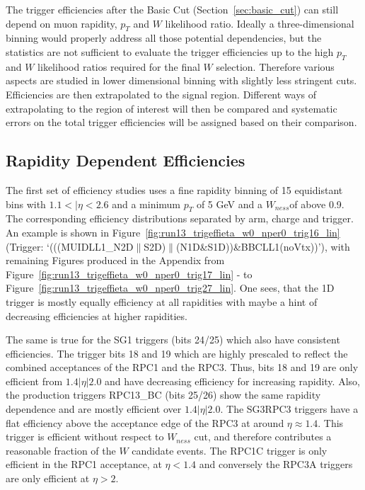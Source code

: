 The trigger efficiencies after the Basic Cut (Section~\ref{sec:basic_cut}) can
still depend on muon rapidity, $p_T$ and $W$ likelihood ratio.  Ideally a
three-dimensional binning would properly address all those potential
dependencies, but the statistics are not sufficient to evaluate the trigger
efficiencies up to the high $p_T$ and $W$ likelihood ratios required for the
final $W$ selection. Therefore various aspects are studied in lower dimensional
binning with slightly less stringent cuts. Efficiencies are then extrapolated to
the signal region. Different ways of extrapolating to the region of interest
will then be compared and systematic errors on the total trigger efficiencies
will be assigned based on their comparison. 

\subsection{Rapidity Dependent Efficiencies}

The first set of efficiency studies uses a fine rapidity binning of 15
equidistant bins with $1.1<\vert\eta<2.6$ and a minimum $p_T$ of 5 GeV and a
$W_{ness}$of above 0.9.  The corresponding efficiency distributions separated by
arm, charge and trigger. An example is shown in
Figure~\ref{fig:run13_trigeffieta_w0_nper0_trig16_lin} (Trigger:
`(((MUIDLL1\_N2D$\|$S2D)$\|$(N1D\&S1D))\&BBCLL1(noVtx))'), with remaining
Figures produced in the Appendix from
Figure~\ref{fig:run13_trigeffieta_w0_nper0_trig17_lin} - to
Figure~\ref{fig:run13_trigeffieta_w0_nper0_trig27_lin}. One sees, that the 1D
trigger is mostly equally efficiency at all rapidities with maybe a hint of
decreasing efficiencies at higher rapidities. 

The same is true for the SG1 triggers (bits 24/25) which also have consistent
efficiencies.  The trigger bits 18 and 19 which are highly prescaled to reflect
the combined acceptances of the RPC1 and the RPC3. Thus, bits 18 and 19 are only
efficient from $1.4 \vert\eta\vert 2.0$ and have decreasing efficiency for
increasing rapidity. Also, the production triggers RPC13\_BC (bits 25/26) show
the same rapidity dependence and are mostly efficient over $1.4 \vert\eta\vert
2.0$.  The SG3RPC3 triggers have a flat efficiency above the acceptance edge of
the RPC3 at around $\eta\approx1.4$. This trigger is efficient without respect
to $W_{ness}$ cut, and therefore contributes a reasonable fraction of the $W$
candidate events.  The RPC1C trigger is only efficient in the RPC1 acceptance,
at $\eta < 1.4$ and conversely the RPC3A triggers are only efficient at $\eta >
2$.

